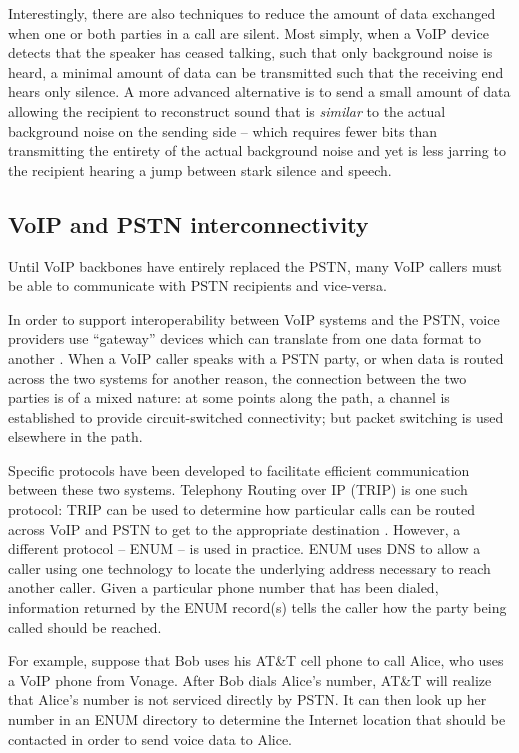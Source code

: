 \documentclass[11pt]{article}
\begin{document}
Interestingly, there are also techniques to reduce the amount of data exchanged
when one or both parties in a call are silent. Most simply, when a VoIP device
detects that the speaker has ceased talking, such that only background noise is
heard, a minimal amount of data can be transmitted such that the receiving end
hears only silence. A more advanced alternative is to send a small amount of
data allowing the recipient to reconstruct sound that is \emph{similar} to the
actual background noise on the sending side -- which requires fewer bits than
transmitting the entirety of the actual background noise and yet is less jarring
to the recipient hearing a jump between stark silence and speech. \cite{goode}

\subsection{VoIP and PSTN interconnectivity}

Until VoIP backbones have entirely replaced the PSTN, many VoIP callers must be
able to communicate with PSTN recipients and vice-versa.

In order to support interoperability between VoIP systems and the PSTN, voice
providers use ``gateway'' devices which can translate from one data format to
another \cite{goode}. When a VoIP caller speaks with a PSTN party, or when data
is routed across the two systems for another reason, the connection between the
two parties is of a mixed nature: at some points along the path, a channel is
established to provide circuit-switched connectivity; but packet switching is
used elsewhere in the path.

Specific protocols have been developed to facilitate efficient communication
between these two systems. Telephony Routing over IP (TRIP) is one such
protocol: TRIP can be used to determine how particular calls can be routed
across VoIP and PSTN to get to the appropriate destination \cite{goode,trip}.
However, a different protocol -- ENUM -- is used in practice. ENUM uses DNS to
allow a caller using one technology to locate the underlying address necessary
to reach another caller. \cite{goode} Given a particular phone number that has
been dialed, information returned by the ENUM record(s) tells the caller how the
party being called should be reached. \cite{voipinfo_enum}

For example, suppose that Bob uses his AT\&T cell phone to call Alice, who uses
a VoIP phone from Vonage. After Bob dials Alice's number, AT\&T will realize
that Alice's number is not serviced directly by PSTN. It can then look up her
number in an ENUM directory to determine the Internet location that should be
contacted in order to send voice data to Alice.
\end{document}
